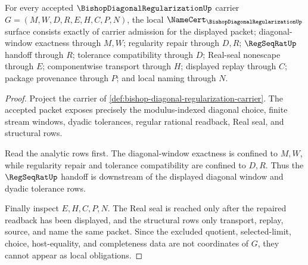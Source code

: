\begin{theorem}
\label{thm:bishop-diagonal-regularization-namecert-obligations}
For every accepted $\BishopDiagonalRegularizationUp$ carrier $G=(M,W,D,R,E,H,C,P,N)$, the local $\NameCert_{\BishopDiagonalRegularizationUp}$ surface consists exactly of carrier admission for the displayed packet; diagonal-window exactness through $M,W$; regularity repair through $D,R$; $\RegSeqRatUp$ handoff through $R$; tolerance compatibility through $D$; Real-seal nonescape through $E$; componentwise transport through $H$; displayed replay through $C$; package provenance through $P$; and local naming through $N$.
\end{theorem}
\begin{proof}
Project the carrier of \autoref{def:bishop-diagonal-regularization-carrier}. The accepted packet exposes precisely the modulus-indexed diagonal choice, finite stream windows, dyadic tolerances, regular rational readback, Real seal, and structural rows.

Read the analytic rows first. The diagonal-window exactness is confined to $M,W$, while regularity repair and tolerance compatibility are confined to $D,R$. Thus the $\RegSeqRatUp$ handoff is downstream of the displayed diagonal window and dyadic tolerance rows.

Finally inspect $E,H,C,P,N$. The Real seal is reached only after the repaired readback has been displayed, and the structural rows only transport, replay, source, and name the same packet. Since the excluded quotient, selected-limit, choice, host-equality, and completeness data are not coordinates of $G$, they cannot appear as local obligations.
\end{proof}

